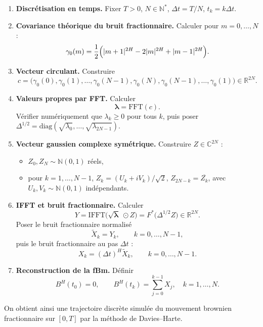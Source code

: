 \documentclass[11pt,a4paper]{article}
\newcommand{\R}{\mathbb{R}}
\newcommand{\C}{\mathbb{C}}
\newcommand{\N}{\mathbb{N}}
\newcommand{\1}{\mathbf{1}}
\newcommand{\bH}{B^{H}}
\begin{document}
\begin{enumerate}
  \item \textbf{Discrétisation en temps.}
        Fixer $T>0$, $N\in\mathbb{N}^\ast$,
        $\Delta t = T/N$, $t_k = k\Delta t$.
  \item \textbf{Covariance théorique du bruit fractionnaire.}
        Calculer pour $m=0,\dots,N$ :
        \[
          \gamma_0(m)
          = \frac{1}{2}
            \Bigl(|m+1|^{2H} - 2|m|^{2H} + |m-1|^{2H}\Bigr).
        \]
  \item \textbf{Vecteur circulant.}
        Construire
        \[
          c = \bigl(\gamma_0(0),\gamma_0(1),\dots,
                    \gamma_0(N-1),\gamma_0(N),
                    \gamma_0(N-1),\dots,\gamma_0(1)\bigr)
          \in\R^{2N}.
        \]
  \item \textbf{Valeurs propres par FFT.}
        Calculer
        \[
          \bm{\lambda} = \mathrm{FFT}(c).
        \]
        Vérifier numériquement que $\lambda_k\ge 0$ pour tous $k$,
        puis poser $\Delta^{1/2}=\mathrm{diag}(\sqrt{\lambda_0},
        \dots,\sqrt{\lambda_{2N-1}})$.
  \item \textbf{Vecteur gaussien complexe symétrique.}
        Construire $Z\in\C^{2N}$ :
        \begin{itemize}
          \item $Z_0,Z_N\sim\N(0,1)$ réels,
          \item pour $k=1,\dots,N-1$,
                $Z_k = (U_k+iV_k)/\sqrt{2}$,
                $Z_{2N-k} = \overline{Z_k}$,
                avec $U_k,V_k\sim\N(0,1)$ indépendants.
        \end{itemize}
  \item \textbf{IFFT et bruit fractionnaire.}
        Calculer
        \[
          Y = \mathrm{IFFT}\bigl(\sqrt{\bm{\lambda}}\;\odot Z\bigr)
          = F^{\ast}\bigl(\Delta^{1/2}Z\bigr)
          \in\R^{2N}.
        \]
        Poser le bruit fractionnaire normalisé
        \[
          \tilde{X}_k = Y_k,\qquad k=0,\dots,N-1,
        \]
        puis le bruit fractionnaire au pas $\Delta t$ :
        \[
          X_k = (\Delta t)^H \tilde{X}_k,\qquad k=0,\dots,N-1.
        \]
  \item \textbf{Reconstruction de la fBm.}
        Définir
        \[
          \bH(t_0) = 0,
          \qquad
          \bH(t_k) = \sum_{j=0}^{k-1} X_j,
          \quad k=1,\dots,N.
        \]
\end{enumerate}

On obtient ainsi une trajectoire discrète simulée du mouvement
brownien fractionnaire sur $[0,T]$ par la méthode de
Davies--Harte.
\end{document}
